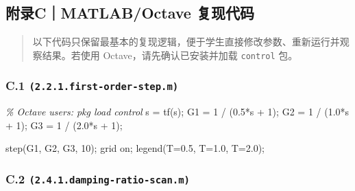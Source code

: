 \documentclass[
  11pt]{article}
\newenvironment{Shaded}{}{}
\newcommand{\CommentTok}[1]{\textcolor[rgb]{0.38,0.63,0.69}{\textit{#1}}}
\newcommand{\FloatTok}[1]{\textcolor[rgb]{0.25,0.63,0.44}{#1}}
\newcommand{\NormalTok}[1]{#1}
\newcommand{\OperatorTok}[1]{\textcolor[rgb]{0.40,0.40,0.40}{#1}}
\newcommand{\SpecialStringTok}[1]{\textcolor[rgb]{0.73,0.40,0.53}{#1}}
\newcommand{\VariableTok}[1]{\textcolor[rgb]{0.10,0.09,0.49}{#1}}
\begin{document}
\subsection{附录C｜MATLAB/Octave
复现代码}\label{ux9644ux5f55cmatlaboctave-ux590dux73b0ux4ee3ux7801}

\begin{quote}
以下代码只保留最基本的复现逻辑，便于学生直接修改参数、重新运行并观察结果。若使用
Octave，请先确认已安装并加载 \texttt{control} 包。
\end{quote}

\subsubsection{\texorpdfstring{C.1
\texttt{(2.2.1.first-order-step.m)}}{C.1 (2.2.1.first-order-step.m)}}\label{c.1-2.2.1.first-order-step.m}

\begin{Shaded}
\begin{Highlighting}[]
\CommentTok{\% Octave users: pkg load control}
\VariableTok{s} \OperatorTok{=} \VariableTok{tf}\NormalTok{(}\SpecialStringTok{\textquotesingle{}s\textquotesingle{}}\NormalTok{)}\OperatorTok{;}
\VariableTok{G1} \OperatorTok{=} \FloatTok{1} \OperatorTok{/}\NormalTok{ (}\FloatTok{0.5}\OperatorTok{*}\VariableTok{s} \OperatorTok{+} \FloatTok{1}\NormalTok{)}\OperatorTok{;}
\VariableTok{G2} \OperatorTok{=} \FloatTok{1} \OperatorTok{/}\NormalTok{ (}\FloatTok{1.0}\OperatorTok{*}\VariableTok{s} \OperatorTok{+} \FloatTok{1}\NormalTok{)}\OperatorTok{;}
\VariableTok{G3} \OperatorTok{=} \FloatTok{1} \OperatorTok{/}\NormalTok{ (}\FloatTok{2.0}\OperatorTok{*}\VariableTok{s} \OperatorTok{+} \FloatTok{1}\NormalTok{)}\OperatorTok{;}

\VariableTok{step}\NormalTok{(}\VariableTok{G1}\OperatorTok{,} \VariableTok{G2}\OperatorTok{,} \VariableTok{G3}\OperatorTok{,} \FloatTok{10}\NormalTok{)}\OperatorTok{;}
\VariableTok{grid} \VariableTok{on}\OperatorTok{;}
\VariableTok{legend}\NormalTok{(}\SpecialStringTok{\textquotesingle{}T=0.5\textquotesingle{}}\OperatorTok{,} \SpecialStringTok{\textquotesingle{}T=1.0\textquotesingle{}}\OperatorTok{,} \SpecialStringTok{\textquotesingle{}T=2.0\textquotesingle{}}\NormalTok{)}\OperatorTok{;}
\end{Highlighting}
\end{Shaded}

\subsubsection{\texorpdfstring{C.2
\texttt{(2.4.1.damping-ratio-scan.m)}}{C.2 (2.4.1.damping-ratio-scan.m)}}\label{c.2-2.4.1.damping-ratio-scan.m}
\end{document}

